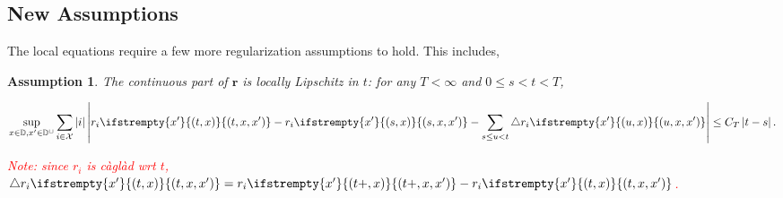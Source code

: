 \documentclass[12pt]{article}
\newcommand{\mb}{\mathbb}
\newcommand{\mc}{\mathcal}
\newcommand{\ov}{\overline}
\newcommand{\te}{\text}
\newcommand{\tr}{\textcolor{red}}
\newcommand{\exmu}[2]{\mb{E}^{#1}\left[#2\right]}	%
\newcommand{\cad}{\mb{D}}							%
\newcommand{\sta}{\mc{X}}							%
\newcommand{\neigh}[1]{\partial_{#1}}				%
\newcommand{\dneigh}[1]{\partial^2_{#1}}			%
\newcommand{\cl}[1]{\ov{#1}}						%
\newcommand{\Xf}{X}									%
\newcommand{\poiss}{N}								%
\newcommand{\rate}{r}								%
\newcommand{\xf}{x}									%
\newcommand{\delt}{\triangle}						%
\newcommand{\poissv}[1]{_{#1}}						%
\newcommand{\vind}[1]{_{#1}}						%
\newcommand{\tme}[1]{(#1)}							%
\newcommand{\tmi}[1]{#1}							%
\newcommand{\stpara}[1]{_{#1}}						%
\newcommand{\gvpara}[2]{^{#1,#2}}					%
\newcommand{\rateset}{\mathbf{\rate}}				%
\newcommand{\jumpbd}[1]{C_{#1}}						%
\newcommand{\Gs}{\mc{G}_\ast}						%
\newcommand{\tmepro}[3]{
\ifstrempty{#3}{
	(#1,#2)}{
	(#1,#2,#3)}}									%
\renewcommand{\sp}[1]{[#1]}							%
\newcommand{\Xg}{Y}									%
\newcommand{\brate}{\alt{\rate}}					%
\newcommand{\inte}[1]{{#1}^\mathrm{o}}				%
\newcommand{\alt}[1]{\tilde{#1}}					%
\newcommand{\law}{\te{Law}}							%
\newtheorem{thms}{Theorem}[section]
\newtheorem{assu}{Assumption}
\begin{document}
%
%
%


\subsection{New Assumptions}
\label{a::not}

The local equations require a few more regularization assumptions to hold. This includes,

\begin{assu}
The continuous part of \(\rateset\) is locally Lipschitz in \(t\): for any \(T < \infty\) and \(0\leq s < t < T\),

\begin{equation}
\sup_{\xf \in \cad, \xf'\in \cad^\sqcup} \sum_{i\in \sta}|i|\left|\rate\stpara{i}\tmepro{t}{\xf}{\xf'} - \rate\stpara{i}\tmepro{s}{\xf}{\xf'} - \sum_{s\leq u < t} \delt \rate\stpara{i}\tmepro{u}{\xf}{\xf'}\right| \leq \jumpbd{T}\left|t - s\right|.
\label{a::tLipschitz}
\end{equation}

\tr{Note: since \(\rate\stpara{i}\) is c\`agl\`ad wrt \(t\), \(\delt\rate\stpara{i}\tmepro{t}{\xf}{\xf'} = \rate\stpara{i}\tmepro{t+}{\xf}{\xf'} - \rate\stpara{i}\tmepro{t}{\xf}{\xf'}\).}
\label{a::liprt}
\end{assu}
\end{document}
